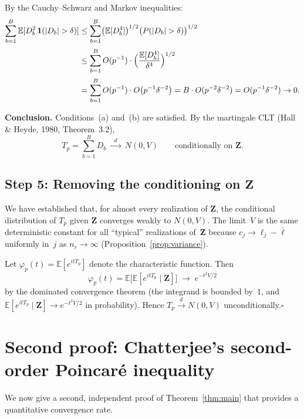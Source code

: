 \documentclass[11pt]{article}
\newcommand{\E}{\mathbb{E}}
\newcommand{\Z}{\bm{Z}}
\begin{document}
By the Cauchy--Schwarz and Markov inequalities:
\begin{align}
  \sum_{b=1}^{B}\E[D_b^{2}\,\mathbf{1}(|D_b|>\delta)]
  &\le \sum_{b=1}^{B}\bigl(\E[D_b^{4}]\bigr)^{1/2}
       \bigl(P(|D_b|>\delta)\bigr)^{1/2}
  \notag\\[2pt]
  &\le \sum_{b=1}^{B}O(p^{-1})\cdot\Bigl(\frac{\E[D_b^{4}]}{\delta^{4}}\Bigr)^{1/2}
  \notag\\[2pt]
  &= \sum_{b=1}^{B}O(p^{-1})\cdot O\bigl(p^{-1}\delta^{-2}\bigr)
  = B\cdot O(p^{-2}\delta^{-2})
  = O(p^{-1}\delta^{-2})\to0.
  \label{eq:lindeberg}
\end{align}

\medskip
\noindent\textbf{Conclusion.}\;
Conditions~(a) and~(b) are satisfied.  By the martingale CLT (Hall \& Heyde,
1980, Theorem~3.2),
\[
  T_p = \sum_{b=1}^{B}D_b
  \;\xrightarrow{\;\;d\;\;}\; N(0,V)
  \qquad\text{conditionally on }\Z.
\]

\subsection*{Step 5: Removing the conditioning on \texorpdfstring{$\Z$}{Z}}

We have established that, for almost every realization of $\Z$, the conditional
distribution of $T_p$ given $\Z$ converges weakly to $N(0,V)$.  The
limit~$V$ is the same deterministic constant for all ``typical'' realizations
of~$\Z$ because $c_j\to\ell_j-\bar\ell$ uniformly in~$j$ as
$n_r\to\infty$ (Proposition~\ref{prop:variance}).

Let $\varphi_p(t)=\E[e^{itT_p}]$ denote the characteristic function.  Then
\[
  \varphi_p(t)
  = \E\bigl[\E[e^{itT_p}\mid\Z]\bigr]
  \;\longrightarrow\; e^{-t^{2}V/2}
\]
by the dominated convergence theorem (the integrand is bounded by~$1$, and
$\E[e^{itT_p}\mid\Z]\to e^{-t^{2}V/2}$ in probability).  Hence
$T_p\xrightarrow{d}N(0,V)$ unconditionally.\hfill$\square$

\section{Second proof: Chatterjee's second-order Poincar\'e
inequality}\label{sec:chatterjee}

We now give a second, independent proof of Theorem~\ref{thm:main} that
provides a quantitative convergence rate.
\end{document}

